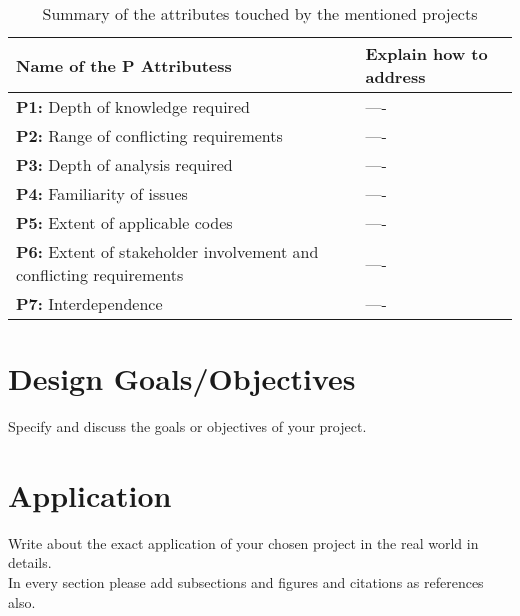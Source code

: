 \documentclass[12pt]{report}
\begin{document}
\begin{table}[htbp]
   \centering
    \caption{Summary of the attributes touched by the mentioned projects}
    \begin{tabular}{|p{6.0 cm}|p{8 cm}|}
    \toprule
        \textbf{Name of the P Attributess} & \textbf{Explain how to address}  \\
        \midrule

    \textbf{P1:} Depth of knowledge required  &  ---- \\
      \hline
       
    \textbf{P2:} Range of conflicting
     requirements  &  ---- \\
      \hline

    \textbf{P3:} Depth of analysis required  &  ---- \\
    \hline
    
    \textbf{P4:} Familiarity of issues  &  ---- \\ 
    \hline
    \textbf{P5:} Extent of applicable codes  &  ---- \\
      \hline
       
    \textbf{P6:} Extent of stakeholder
     involvement and conflicting
     requirements  &  ---- \\
      \hline

    \textbf{P7:} Interdependence  &  ---- \\
    \hline
        
    \end{tabular}
    \label{tab:IC}
\end{table}

\section{Design Goals/Objectives}
Specify and discuss the goals or objectives of your project.

\section{Application}
Write about the exact application of your chosen project in the real world in details.\\In every section please add subsections and figures and citations as references\cite{farokhzad2009impact} also.





\newpage
\end{document}
